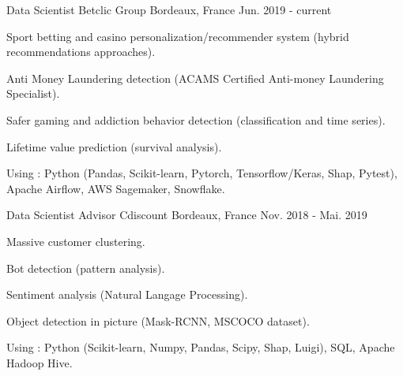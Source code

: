 

\begin{cventries}

  \cventry
    {Data Scientist} %
    {Betclic Group} %
    {Bordeaux, France} %
    {Jun. 2019 - current} %
    {
      \begin{cvitems} %
        \item {Sport betting and casino personalization/recommender system (hybrid recommendations approaches).}
        \item {Anti Money Laundering detection (ACAMS Certified Anti-money Laundering Specialist).}
        \item {Safer gaming and addiction behavior detection (classification and time series).}
        \item {Lifetime value prediction (survival analysis).}
      \end{cvitems}
    \vspace{9}
    Using : Python (Pandas, Scikit-learn, Pytorch, Tensorflow/Keras, Shap, Pytest), Apache Airflow, AWS Sagemaker, Snowflake.
    }

  \cventry
    {Data Scientist Advisor} %
    {Cdiscount} %
    {Bordeaux, France} %
    {Nov. 2018 - Mai. 2019} %
    {
       \begin{cvitems} %
        \item {Massive customer clustering.}
        \item {Bot detection (pattern analysis).}
        \item {Sentiment analysis (Natural Langage Processing).}
        \item {Object detection in picture (Mask-RCNN, MSCOCO dataset).}
      \end{cvitems}
      \vspace{9}
    Using : Python (Scikit-learn, Numpy, Pandas, Scipy, Shap, Luigi), SQL, Apache Hadoop Hive.
    }


\end{cventries}
